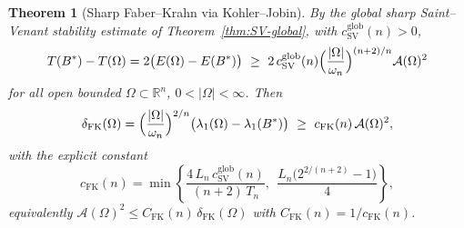 \documentclass[11pt]{amsart}
\newtheorem{theorem}{Theorem}[section]
\theoremstyle{definition}
\newcommand{\R}{\mathbb R}
\newcommand{\Om}{\Omega}
\newcommand{\Fr}{\mathcal A}
\newcommand{\abs}[1]{\left|#1\right|}
\begin{document}
\begin{theorem}[Sharp Faber--Krahn via Kohler--Jobin]\label{thm:fk}
By the global sharp Saint--Venant stability estimate of
Theorem~\ref{thm:SV-global}, with $c_{\mathrm{SV}}^{\mathrm{glob}}(n)>0$,
\begin{equation}\label{eq:sv-input}
  T(B^*)-T(\Om)=2\bigl(E(\Om)-E(B^*)\bigr)
  \ \ge\ 2\,c_{\mathrm{SV}}^{\mathrm{glob}}(n)
  \Bigl(\frac{\abs\Om}{\omega_n}\Bigr)^{(n+2)/n}\Fr(\Om)^2
\end{equation}
for all open bounded $\Om\subset\R^n$, $0<\abs\Om<\infty$. Then
\begin{equation}\label{eq:fk-out}
  \delta_{\mathrm{FK}}(\Om)
  =\Bigl(\frac{\abs\Om}{\omega_n}\Bigr)^{2/n}
   \bigl(\lambda_1(\Om)-\lambda_1(B^*)\bigr)
  \ \ge\ c_{\mathrm{FK}}(n)\,\Fr(\Om)^2,
\end{equation}
with the explicit constant
\begin{equation}\label{eq:cfk}
  c_{\mathrm{FK}}(n)=\min\!\left\{
  \frac{4\,L_n\,c_{\mathrm{SV}}^{\mathrm{glob}}(n)}{(n+2)\,T_n},\ \
  \frac{L_n\bigl(2^{2/(n+2)}-1\bigr)}{4}\right\},
\end{equation}
equivalently $\Fr(\Om)^2\le C_{\mathrm{FK}}(n)\,\delta_{\mathrm{FK}}(\Om)$
with $C_{\mathrm{FK}}(n)=1/c_{\mathrm{FK}}(n)$.
\end{theorem}
\end{document}
